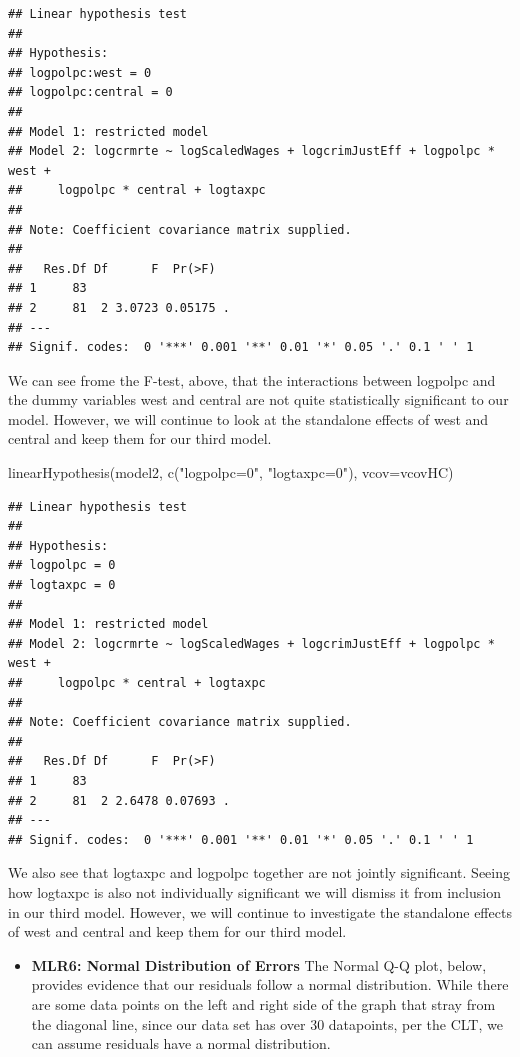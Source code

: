 \documentclass[]{article}
\newenvironment{Shaded}{}{}
\newcommand{\DataTypeTok}[1]{#1}
\newcommand{\KeywordTok}[1]{\textcolor[rgb]{0.00,0.00,1.00}{#1}}
\newcommand{\NormalTok}[1]{#1}
\newcommand{\StringTok}[1]{\textcolor[rgb]{0.00,0.50,0.50}{#1}}
\providecommand{\tightlist}{%
  \setlength{\itemsep}{0pt}\setlength{\parskip}{0pt}}
\begin{document}
\begin{verbatim}
## Linear hypothesis test
## 
## Hypothesis:
## logpolpc:west = 0
## logpolpc:central = 0
## 
## Model 1: restricted model
## Model 2: logcrmrte ~ logScaledWages + logcrimJustEff + logpolpc * west + 
##     logpolpc * central + logtaxpc
## 
## Note: Coefficient covariance matrix supplied.
## 
##   Res.Df Df      F  Pr(>F)  
## 1     83                    
## 2     81  2 3.0723 0.05175 .
## ---
## Signif. codes:  0 '***' 0.001 '**' 0.01 '*' 0.05 '.' 0.1 ' ' 1
\end{verbatim}

We can see frome the F-test, above, that the interactions between
logpolpc and the dummy variables west and central are not quite
statistically significant to our model. However, we will continue to
look at the standalone effects of west and central and keep them for our
third model.

\begin{Shaded}
\begin{Highlighting}[]
\KeywordTok{linearHypothesis}\NormalTok{(model2, }\KeywordTok{c}\NormalTok{(}\StringTok{"logpolpc=0"}\NormalTok{, }\StringTok{"logtaxpc=0"}\NormalTok{), }\DataTypeTok{vcov=}\NormalTok{vcovHC)}
\end{Highlighting}
\end{Shaded}

\begin{verbatim}
## Linear hypothesis test
## 
## Hypothesis:
## logpolpc = 0
## logtaxpc = 0
## 
## Model 1: restricted model
## Model 2: logcrmrte ~ logScaledWages + logcrimJustEff + logpolpc * west + 
##     logpolpc * central + logtaxpc
## 
## Note: Coefficient covariance matrix supplied.
## 
##   Res.Df Df      F  Pr(>F)  
## 1     83                    
## 2     81  2 2.6478 0.07693 .
## ---
## Signif. codes:  0 '***' 0.001 '**' 0.01 '*' 0.05 '.' 0.1 ' ' 1
\end{verbatim}

We also see that logtaxpc and logpolpc together are not jointly
significant. Seeing how logtaxpc is also not individually significant we
will dismiss it from inclusion in our third model. However, we will
continue to investigate the standalone effects of west and central and
keep them for our third model.

\begin{itemize}
\tightlist
\item
  \textbf{MLR6: Normal Distribution of Errors} The Normal Q-Q plot,
  below, provides evidence that our residuals follow a normal
  distribution. While there are some data points on the left and right
  side of the graph that stray from the diagonal line, since our data
  set has over 30 datapoints, per the CLT, we can assume residuals have
  a normal distribution.
\end{itemize}
\end{document}
